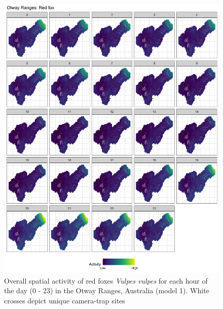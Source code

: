 \documentclass[11pt,a4paper,titlepage,twoside,openright]{style/unimelbthesis}
\begin{document}
\begin{mainmatter}
\begin{figure}
{\centering \includegraphics[width=1\linewidth]{figure/spte_facet_o_fox} 

}

\caption{Overall spatial activity of red foxes \textit{Vulpes vulpes} for each hour of the day (0 - 23) in the Otway Ranges, Australia (model 1). White crosses depict unique camera-trap sites}\label{fig:diel-space-o-fox}
\end{figure}
\newpage
\begin{figure}


\end{figure}
\end{mainmatter}
\end{document}

